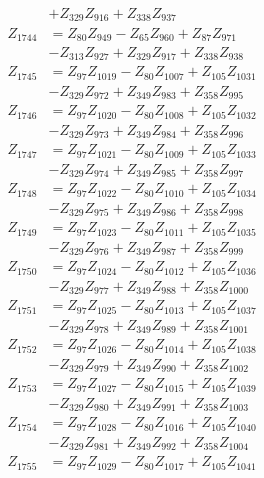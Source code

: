 \begin{multicols}{2}
\begin{align}
&+ Z_{329}Z_{916} + Z_{338}Z_{937} \nonumber \\
Z_{1744} &= Z_{80}Z_{949} - Z_{65}Z_{960} + Z_{87}Z_{971}  \nonumber \\
&- Z_{313}Z_{927} + Z_{329}Z_{917} + Z_{338}Z_{938} \nonumber \\
Z_{1745} &= Z_{97}Z_{1019} - Z_{80}Z_{1007} + Z_{105}Z_{1031}  \nonumber \\
&- Z_{329}Z_{972} + Z_{349}Z_{983} + Z_{358}Z_{995} \nonumber \\
Z_{1746} &= Z_{97}Z_{1020} - Z_{80}Z_{1008} + Z_{105}Z_{1032}  \nonumber \\
&- Z_{329}Z_{973} + Z_{349}Z_{984} + Z_{358}Z_{996} \nonumber \\
Z_{1747} &= Z_{97}Z_{1021} - Z_{80}Z_{1009} + Z_{105}Z_{1033}  \nonumber \\
&- Z_{329}Z_{974} + Z_{349}Z_{985} + Z_{358}Z_{997} \nonumber \\
Z_{1748} &= Z_{97}Z_{1022} - Z_{80}Z_{1010} + Z_{105}Z_{1034}  \nonumber \\
&- Z_{329}Z_{975} + Z_{349}Z_{986} + Z_{358}Z_{998} \nonumber \\
Z_{1749} &= Z_{97}Z_{1023} - Z_{80}Z_{1011} + Z_{105}Z_{1035}  \nonumber \\
&- Z_{329}Z_{976} + Z_{349}Z_{987} + Z_{358}Z_{999} \nonumber \\
Z_{1750} &= Z_{97}Z_{1024} - Z_{80}Z_{1012} + Z_{105}Z_{1036}  \nonumber \\
&- Z_{329}Z_{977} + Z_{349}Z_{988} + Z_{358}Z_{1000} \nonumber \\
Z_{1751} &= Z_{97}Z_{1025} - Z_{80}Z_{1013} + Z_{105}Z_{1037}  \nonumber \\
&- Z_{329}Z_{978} + Z_{349}Z_{989} + Z_{358}Z_{1001} \nonumber \\
Z_{1752} &= Z_{97}Z_{1026} - Z_{80}Z_{1014} + Z_{105}Z_{1038}  \nonumber \\
&- Z_{329}Z_{979} + Z_{349}Z_{990} + Z_{358}Z_{1002} \nonumber \\
Z_{1753} &= Z_{97}Z_{1027} - Z_{80}Z_{1015} + Z_{105}Z_{1039}  \nonumber \\
&- Z_{329}Z_{980} + Z_{349}Z_{991} + Z_{358}Z_{1003} \nonumber \\
Z_{1754} &= Z_{97}Z_{1028} - Z_{80}Z_{1016} + Z_{105}Z_{1040}  \nonumber \\
&- Z_{329}Z_{981} + Z_{349}Z_{992} + Z_{358}Z_{1004} \nonumber \\
Z_{1755} &= Z_{97}Z_{1029} - Z_{80}Z_{1017} + Z_{105}Z_{1041}  \nonumber \\

\end{align}
\end{multicols}
